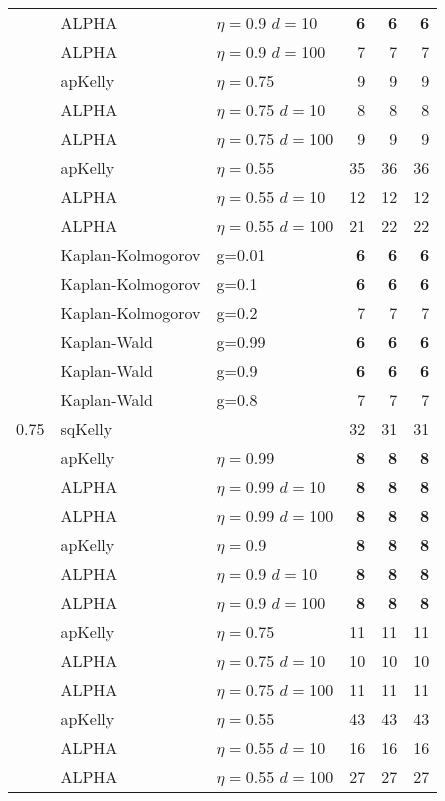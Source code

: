 \documentclass[aoas]{imsart}
\begin{document}
\begin{table}
\begin{tabular}{lll|rrr}
\cline{2-6}
& ALPHA & $\eta=$0.9 $d=$10 & \bf{6}  & \bf{6}  & \bf{6}  \\
& ALPHA & $\eta=$0.9 $d=$100 & 7  & 7  & 7  \\
\cline{2-6} & apKelly & $\eta=$0.75 & 9  & 9  & 9  \\
\cline{2-6}
& ALPHA & $\eta=$0.75 $d=$10 & 8  & 8  & 8  \\
& ALPHA & $\eta=$0.75 $d=$100 & 9  & 9  & 9  \\
\cline{2-6} & apKelly & $\eta=$0.55 & 35  & 36  & 36  \\
\cline{2-6}
& ALPHA & $\eta=$0.55 $d=$10 & 12  & 12  & 12  \\
& ALPHA & $\eta=$0.55 $d=$100 & 21  & 22  & 22  \\
\cline{2-6}
 & Kaplan-Kolmogorov & g=0.01 & \bf{6}  & \bf{6}  & \bf{6}  \\
 & Kaplan-Kolmogorov & g=0.1 & \bf{6}  & \bf{6}  & \bf{6}  \\
 & Kaplan-Kolmogorov & g=0.2 & 7  & 7  & 7  \\
\cline{2-6}
 & Kaplan-Wald & g=0.99 & \bf{6}  & \bf{6}  & \bf{6}  \\
 & Kaplan-Wald & g=0.9 & \bf{6}  & \bf{6}  & \bf{6}  \\
 & Kaplan-Wald & g=0.8 & 7  & 7  & 7  \\
\hline 0.75 & sqKelly & & 32  & 31  & 31  \\
\cline{2-6} & apKelly & $\eta=$0.99 & \bf{8}  & \bf{8}  & \bf{8}  \\
\cline{2-6}
& ALPHA & $\eta=$0.99 $d=$10 & \bf{8}  & \bf{8}  & \bf{8}  \\
& ALPHA & $\eta=$0.99 $d=$100 & \bf{8}  & \bf{8}  & \bf{8}  \\
\cline{2-6} & apKelly & $\eta=$0.9 & \bf{8}  & \bf{8}  & \bf{8}  \\
\cline{2-6}
& ALPHA & $\eta=$0.9 $d=$10 & \bf{8}  & \bf{8}  & \bf{8}  \\
& ALPHA & $\eta=$0.9 $d=$100 & \bf{8}  & \bf{8}  & \bf{8}  \\
\cline{2-6} & apKelly & $\eta=$0.75 & 11  & 11  & 11  \\
\cline{2-6}
& ALPHA & $\eta=$0.75 $d=$10 & 10  & 10  & 10  \\
& ALPHA & $\eta=$0.75 $d=$100 & 11  & 11  & 11  \\
\cline{2-6} & apKelly & $\eta=$0.55 & 43  & 43  & 43  \\
\cline{2-6}
& ALPHA & $\eta=$0.55 $d=$10 & 16  & 16  & 16  \\
& ALPHA & $\eta=$0.55 $d=$100 & 27  & 27  & 27  \\

\end{tabular}
\end{table}
\end{document}
